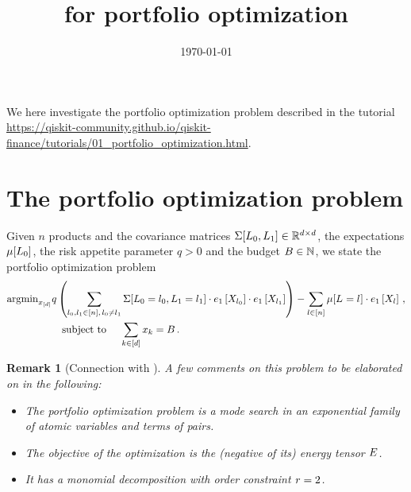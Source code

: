 \documentclass[aps,onecolumn,nofootinbib,pra]{article}
\newtheorem{remark}{Remark}
\begin{document}
\title{\tnreason for portfolio optimization}

\maketitle
\date{\today}

We here investigate the portfolio optimization problem described in the tutorial \url{https://qiskit-community.github.io/qiskit-finance/tutorials/01_portfolio_optimization.html}.

\section{The portfolio optimization problem}

\newcommand{\productsnum}{n}


Given $\productsnum$ products and the covariance matrices $\Sigma[L_{0},L_{1}]\in\mathbb{R}^{d\times d}$, the expectations $\mu[L_{0}]$, the risk appetite parameter $q>0$ and the budget $B\in\mathbb{N}$, we state the portfolio optimization problem
\begin{align}
	\argmin_{\shortcatindices} &
	q \left(\sum_{\selindexof{0},\selindexof{1}\in[\productsnum] , \, \selindexof{0}\neq\selindexof{1}} 
	\Sigma[\indexedselvariableof{0},\indexedselvariableof{1}] \cdot \onehotmapofat{1}{\catvariableof{\selindexof{0}}}\cdot \onehotmapofat{1}{\catvariableof{\selindexof{1}}}\right) 
	- \sum_{\selindex\in[\productsnum]} \mu[\indexedselvariable] \cdot \onehotmapofat{1}{\catvariableof{\selindex}} \, , \\
	& \quad \text{subject to } \quad \sum_{\catenumeratorin}\catindexof{\catenumerator} = B\, . 
\end{align}

\begin{remark}[Connection with \tnreason]
A few comments on this problem to be elaborated on in the following:
\begin{itemize}
	\item	The portfolio optimization problem is a mode search in an exponential family of atomic variables and terms of pairs.
	\item The objective of the optimization is the (negative of its) energy tensor $E$.
	 \item It has a monomial decomposition with order constraint $r=2$.
\end{itemize}
\end{remark}
\end{document}
